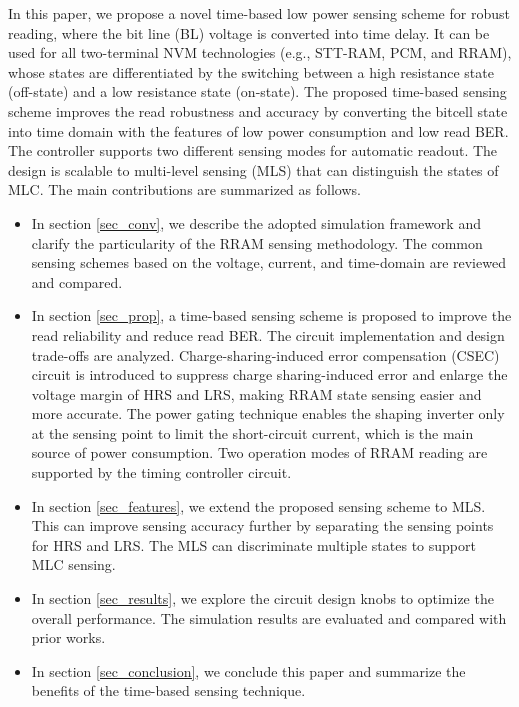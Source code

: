 In this paper, we propose a novel time-based low power sensing scheme for robust reading, where the bit line (BL) voltage is converted into time delay.
It can be used for all two-terminal NVM technologies (e.g., STT-RAM, PCM, and RRAM), whose states are differentiated by the switching between a high resistance state (off-state) and a low resistance state (on-state). 
The proposed time-based sensing scheme improves the read robustness and accuracy by converting the bitcell state into time domain with the features of low power consumption and low read BER. The controller supports two different sensing modes for automatic readout. The design is scalable to multi-level sensing (MLS) that can distinguish the states of MLC. The main contributions are summarized as follows.
\begin{itemize}
  \item [1)] 
  In section \ref{sec_conv}, we describe the adopted simulation framework and clarify the particularity of the RRAM sensing methodology. The common sensing schemes based on the voltage, current, and time-domain are reviewed and compared.  
  \item [2)]
  In section \ref{sec_prop}, a time-based sensing scheme is proposed to improve the read reliability and reduce read BER. The circuit implementation and design trade-offs are analyzed. Charge-sharing-induced error compensation (CSEC) circuit is introduced to suppress charge sharing-induced error and enlarge the voltage margin of HRS and LRS, making RRAM state sensing easier and more accurate. The power gating technique enables the shaping inverter only at the sensing point to limit the short-circuit current, which is the main source of power consumption. Two operation modes of RRAM reading are supported by the timing controller circuit.
  \item [3)]
  In section \ref{sec_features}, we extend the proposed sensing scheme to MLS. This can improve sensing accuracy further by separating the sensing points for HRS and LRS. The MLS can discriminate multiple states to support MLC sensing. 
  \item [4)]
  In section \ref{sec_results}, we explore the circuit design knobs to optimize the overall performance. The simulation results are evaluated and compared with prior works. 
  \item [5)]
  In section \ref{sec_conclusion}, we conclude this paper and summarize the benefits of the time-based sensing technique.
\end{itemize}

